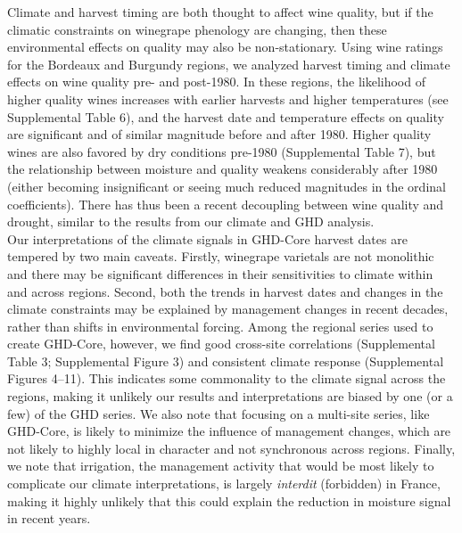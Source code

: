 \documentclass[final]{nature}
\begin{document}
\indent Climate and harvest timing are both thought to affect wine quality, but if the climatic constraints on winegrape phenology are changing, then these environmental effects on quality may also be non-stationary. Using wine ratings for the Bordeaux and Burgundy regions\cite{Broadbent2002}, we analyzed harvest timing and climate effects on wine quality pre- and post-1980. In these regions, the likelihood of higher quality wines increases with earlier harvests and higher temperatures (see Supplemental Table 6), and the harvest date and temperature effects on quality are significant and of similar magnitude before and after 1980. Higher quality wines are also favored by dry conditions pre-1980 (Supplemental Table 7), but the relationship between moisture and quality weakens considerably after 1980 (either becoming insignificant or seeing much reduced magnitudes in the ordinal coefficients). There has thus been a recent decoupling between wine quality and drought, similar to the results from our climate and GHD analysis.\\
\indent Our interpretations of the climate signals in GHD-Core harvest dates are tempered by two main caveats. Firstly, winegrape varietals are not monolithic and there may be significant differences in their sensitivities to climate within and across regions\cite{Parker2013}. Second, both the trends in harvest dates and changes in the climate constraints may be explained by management changes in recent decades, rather than shifts in environmental forcing. Among the regional series used to create GHD-Core, however, we find good cross-site correlations (Supplemental Table 3; Supplemental Figure 3) and consistent climate response (Supplemental Figures 4--11). This indicates some commonality to the climate signal across the regions, making it unlikely our results and interpretations are biased by one (or a few) of the GHD series. We also note that focusing on a multi-site series, like GHD-Core, is likely to minimize the influence of management changes, which are not likely to highly local in character and not synchronous across regions. Finally, we note that irrigation, the management activity that would be most likely to complicate our climate interpretations, is largely \emph{interdit} (forbidden) in France, making it highly unlikely that this could explain the reduction in moisture signal in recent years.\\
\end{document}
